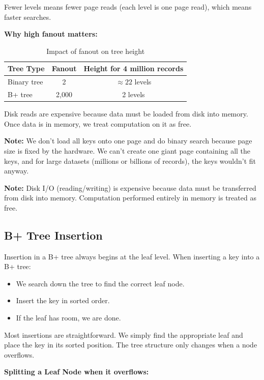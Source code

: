 Fewer levels means fewer page reads (each level is one page read), which means faster searches.

\textbf{Why high fanout matters:}

\begin{table}[H]
    \centering
    \begin{tabular}{lcc}
        \toprule
        \textbf{Tree Type} & \textbf{Fanout} & \textbf{Height for 4 million records} \\
        \midrule
        Binary tree & 2 & $\approx 22$ levels \\
        B+ tree & 2,000 & 2 levels \\
        \bottomrule
    \end{tabular}
    \caption{Impact of fanout on tree height}
    \label{tab:fanout}
\end{table}

Disk reads are expensive because data must be loaded from disk into memory. Once data is in memory, we treat computation on it as free.

\textbf{Note:} We don't load all keys onto one page and do binary search because page size is fixed by the hardware. We can't create one giant page containing all the keys, and for large datasets (millions or billions of records), the keys wouldn't fit anyway.

\textbf{Note:} Disk I/O (reading/writing) is expensive because data must be transferred from disk into memory. Computation performed entirely in memory is treated as free.

\subsection{B+ Tree Insertion}

Insertion in a B+ tree always begins at the leaf level. When inserting a key into a B+ tree:
\begin{itemize}
    \item We search down the tree to find the correct leaf node.
    \item Insert the key in sorted order.
    \item If the leaf has room, we are done.
\end{itemize}
Most insertions are straightforward. We simply find the appropriate leaf and place the key in its sorted position. The tree structure only changes when a node overflows.

\textbf{Splitting a Leaf Node when it overflows:}

